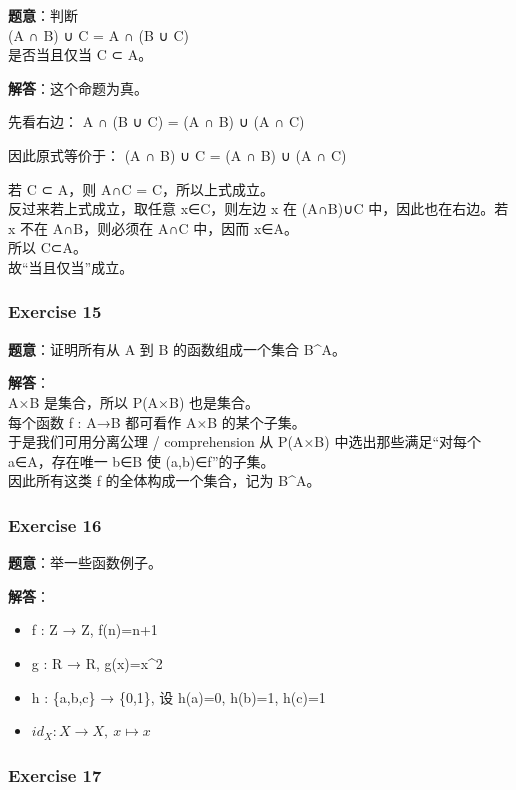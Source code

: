 \documentclass[
  11pt,
]{article}
\providecommand{\tightlist}{%
  \setlength{\itemsep}{0pt}\setlength{\parskip}{0pt}}
\begin{document}
\textbf{题意}：判断\\
(A ∩ B) ∪ C = A ∩ (B ∪ C)\\
是否当且仅当 C ⊂ A。

\textbf{解答}：这个命题为真。

先看右边： A ∩ (B ∪ C) = (A ∩ B) ∪ (A ∩ C)

因此原式等价于： (A ∩ B) ∪ C = (A ∩ B) ∪ (A ∩ C)

若 C ⊂ A，则 A∩C = C，所以上式成立。\\
反过来若上式成立，取任意 x∈C，则左边 x 在 (A∩B)∪C 中，因此也在右边。若 x
不在 A∩B，则必须在 A∩C 中，因而 x∈A。\\
所以 C⊂A。\\
故``当且仅当''成立。

\subsubsection{Exercise 15}\label{exercise-15}

\textbf{题意}：证明所有从 A 到 B 的函数组成一个集合 B\^{}A。

\textbf{解答}：\\
A×B 是集合，所以 P(A×B) 也是集合。\\
每个函数 f : A→B 都可看作 A×B 的某个子集。\\
于是我们可用分离公理 / comprehension 从 P(A×B) 中选出那些满足``对每个
a∈A，存在唯一 b∈B 使 (a,b)∈f''的子集。\\
因此所有这类 f 的全体构成一个集合，记为 B\^{}A。

\subsubsection{Exercise 16}\label{exercise-16}

\textbf{题意}：举一些函数例子。

\textbf{解答}：

\begin{itemize}
\tightlist
\item
  f : Z → Z, f(n)=n+1
\item
  g : R → R, g(x)=x\^{}2
\item
  h : \{a,b,c\} → \{0,1\}, 设 h(a)=0, h(b)=1, h(c)=1
\item
  \(id_X : X\to X,\ x\mapsto x\)
\end{itemize}

\subsubsection{Exercise 17}\label{exercise-17}
\end{document}
